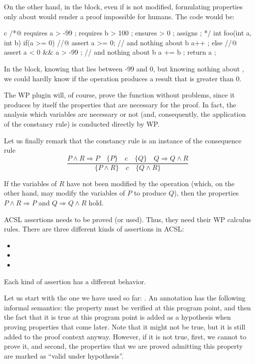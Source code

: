 On the other hand, in the  block, even if  is
not modified, formulating properties only about  would render
a proof impossible for humans. The code would be:



\begin{CodeBlock}{c}
/*@
  requires a > -99 ;
  requires b > 100 ;
  ensures  \result > 0 ;
  assigns  \nothing ;
*/
int foo(int a, int b){
  if(a >= 0){
    //@ assert a >= 0; // and nothing about b
    a++ ;
  } else {
    //@ assert a < 0 && a > -99 ; // and nothing about b
    a += b ;
  }
  return a ;
}
\end{CodeBlock}



In the  block, knowing that lies between -99 and
0, but knowing nothing about , we could hardly know if the
operation  produces a result that is greater than 0.

The WP plugin will, of course, prove the function without problems,
since it produces by itself the properties that are necessary for the
proof. In fact, the analysis which variables are necessary or not (and,
consequently, the application of the constancy rule) is conducted
directly by WP.

Let us finally remark that the constancy rule is an instance of the
consequence rule
$$\dfrac{P \wedge R \Rightarrow P \quad \{P\}\quad c\quad \{Q\} \quad Q \Rightarrow Q \wedge R}{\{P \wedge R\}\quad c\quad \{Q \wedge R\}}$$


If the variables of $R$ have not been modified by the operation
(which, on the other hand, may modify the variables of $P$ to produce
$Q$), then the properties $P \wedge R \Rightarrow P$ and
$Q \Rightarrow Q \wedge R$ hold.




ACSL assertions needs to be proved (or used). Thus, they need their WP calculus
rules. There are three different kinds of assertions in ACSL:
\begin{itemize}
  \item {}
  \item {}
  \item {}
\end{itemize}


Each kind of assertion has a different behavior.


Let us start with the one we have used so far: . An
annotation  has the following informal semantics: the
property  must be verified at this program point, and then the
fact that it is true at this program point is added as a hypothesis when proving
properties that come later. Note that it might not be true, but it is still
added to the proof context anyway. However, if it is not true, first, we cannot
to prove it, and second, the properties that we are proved admitting this
property are marked as ``valid under hypothesis''.


